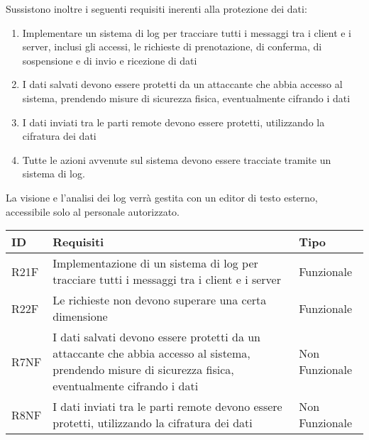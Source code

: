 Sussistono inoltre i seguenti requisiti inerenti alla protezione dei dati:
\begin{enumerate}
  \item Implementare un sistema di log per tracciare tutti i messaggi tra i client e i server, inclusi gli accessi, le richieste di prenotazione, di conferma, di sospensione e di invio e ricezione di dati
  \item I dati salvati devono essere protetti da un attaccante che abbia accesso al sistema, prendendo misure di sicurezza fisica, eventualmente cifrando i dati
  \item I dati inviati tra le parti remote devono essere protetti, utilizzando la cifratura dei dati
  \item Tutte le azioni avvenute sul sistema devono essere tracciate
        tramite un sistema di log.
\end{enumerate}

\raggedright{La visione e l'analisi dei log verrà gestita
  con un editor di testo esterno, accessibile solo al personale
  autorizzato.}
\hfill \break

\begin{tabular} {|P{1.3cm}|P{11.2cm}|P{3cm}|}
  \hline
  \textbf{ID}                       & \textbf{Requisiti}                                                  & \textbf{Tipo} \\
  \hline
  R21F                              & Implementazione di un sistema di log per tracciare tutti i messaggi
  tra i client e i server           & Funzionale                                                                          \\
  \hline
  R22F                              & Le richieste non devono superare una certa dimensione               & Funzionale    \\
  \hline
  R7NF                              & I dati salvati devono essere protetti da un attaccante che abbia
  accesso al sistema, prendendo misure di sicurezza fisica, eventualmente
  cifrando i dati                   & Non Funzionale                                                                      \\
  \hline
  R8NF                              & I dati inviati tra le parti remote devono essere protetti,
  utilizzando la cifratura dei dati & Non Funzionale                                                                      \\
  \hline
\end{tabular}
\clearpage